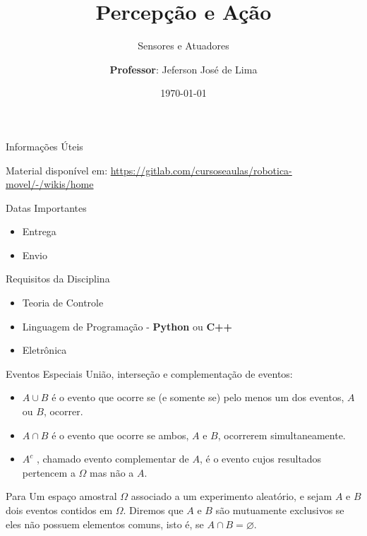\documentclass{beamer}
\title{Percepção e Ação}
\subtitle{Sensores e Atuadores}
\date{\today}
\author[Jeferson José de Lima]{
  \textbf{Professor}: Jeferson José de Lima}
\institute[UTFPR-PB]{Departamento de Informática (DAINF)}
\newcommand{\pausar}{\pause}
\begin{document}
\maketitle

\begin{frame}{Informações Úteis}
	\begin{block}{Material disponível em:}
		\href{Robótica Móvel - Wiki}{https://gitlab.com/cursoseaulas/robotica-movel/-/wikis/home}
	\end{block} 
	\pausar
	\begin{block}{Datas Importantes}
		\begin{itemize}
		\item Entrega
		\item Envio
		\end{itemize}
	\end{block}
	\pausar
	\begin{block}{Requisitos da Disciplina}
		\begin{itemize}
		\item Teoria de Controle
		\item Linguagem de Programação - \textbf{Python} ou \textbf{C++}
		\item Eletrônica
		\end{itemize}
	\end{block}
\end{frame}



\begin{frame}{Eventos Especiais}
União, interseção e complementação de eventos:

\begin{itemize}
	\item $A  \cup B$ é o evento que ocorre se (e somente se) pelo menos um dos eventos, $A$ ou $B$, ocorrer.
	\item $A \cap B$ é o evento que ocorre se ambos, $A$ e $B$, ocorrerem simultaneamente.
	\item $A^c$ , chamado evento complementar de $A$, é o evento cujos resultados pertencem a $\Omega$ mas não a $A$.
\end{itemize}

\begin{block}{Para}
	Um espaço amostral $\Omega$ associado a um experimento aleatório, e sejam $A$ e $B$ dois eventos
	contidos em $\Omega$. Diremos que $A$ e $B$ são mutuamente exclusivos se eles não possuem elementos comuns,
	isto é, se $A \cap B = \varnothing$.
\end{block}

\end{frame}
\end{document}
